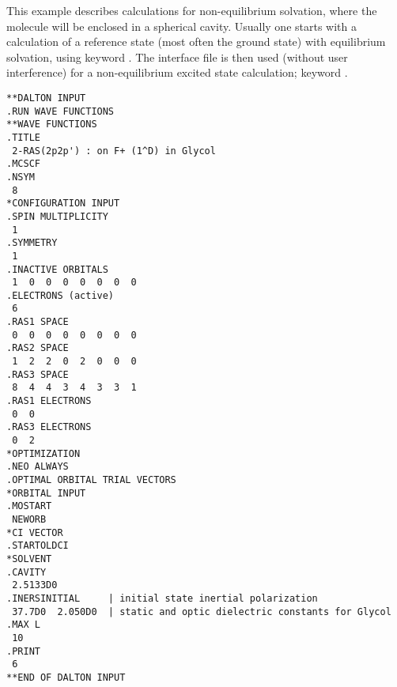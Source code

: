\begin{center}
\end{center}

This example describes calculations for non-equilibrium
solvation, where the mole\-cule will
be enclosed in a spherical cavity. Usually one starts
with a calculation of a reference state (most often the ground
state) with equilibrium solvation, using keyword . The
interface file is then used (without user interference) for a
non-equilibrium excited state calculation; keyword .

\begin{verbatim}
**DALTON INPUT
.RUN WAVE FUNCTIONS
**WAVE FUNCTIONS
.TITLE
 2-RAS(2p2p') : on F+ (1^D) in Glycol
.MCSCF
.NSYM
 8
*CONFIGURATION INPUT
.SPIN MULTIPLICITY
 1
.SYMMETRY
 1
.INACTIVE ORBITALS
 1  0  0  0  0  0  0  0
.ELECTRONS (active)
 6
.RAS1 SPACE
 0  0  0  0  0  0  0  0
.RAS2 SPACE
 1  2  2  0  2  0  0  0
.RAS3 SPACE
 8  4  4  3  4  3  3  1
.RAS1 ELECTRONS
 0  0
.RAS3 ELECTRONS
 0  2
*OPTIMIZATION
.NEO ALWAYS
.OPTIMAL ORBITAL TRIAL VECTORS
*ORBITAL INPUT
.MOSTART
 NEWORB
*CI VECTOR
.STARTOLDCI
*SOLVENT
.CAVITY
 2.5133D0
.INERSINITIAL     | initial state inertial polarization
 37.7D0  2.050D0  | static and optic dielectric constants for Glycol
.MAX L
 10
.PRINT
 6
**END OF DALTON INPUT
\end{verbatim}
\label{sirius_ex8}
